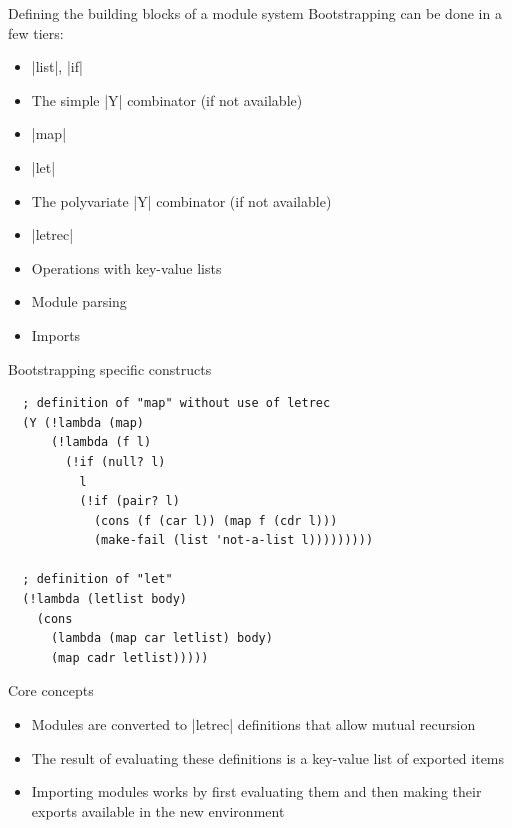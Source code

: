 \begin{frame}[fragile]{Defining the building blocks of a module system}
Bootstrapping can be done in a few tiers:
\begin{itemize}
    \item \linline|list|, \linline|if|
    \item The simple \linline|Y| combinator (if not available)
    \item \linline|map|
    \item \linline|let|
    \item The polyvariate \linline|Y| combinator (if not available)
    \item \linline|letrec|
    \item Operations with key-value lists
    \item Module parsing
    \item Imports
\end{itemize}
\end{frame}

\begin{frame}[fragile]{Bootstrapping specific constructs}
\begin{verbatim}
  ; definition of "map" without use of letrec
  (Y (!lambda (map)
      (!lambda (f l)
        (!if (null? l)
          l
          (!if (pair? l)
            (cons (f (car l)) (map f (cdr l)))
            (make-fail (list 'not-a-list l)))))))))

  ; definition of "let"
  (!lambda (letlist body)
    (cons
      (lambda (map car letlist) body)
      (map cadr letlist)))))
\end{verbatim}
\end{frame}
\begin{frame}[fragile]{Core concepts}
\begin{itemize}
    \item Modules are converted to \linline|letrec| definitions that allow mutual recursion
    \item The result of evaluating these definitions is a key-value list of exported items
    \item Importing modules works by first evaluating them and then making their exports available in the new environment
\end{itemize}
\end{frame}

